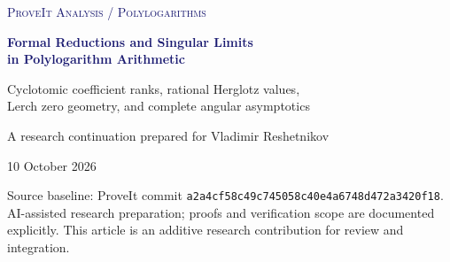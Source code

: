\documentclass[11pt,a4paper]{article}
\theoremstyle{definition}
\theoremstyle{remark}
\numberwithin{equation}{section}
\begin{document}
\hypersetup{pageanchor=false}
\begin{titlepage}
\thispagestyle{empty}
\setlength{\parindent}{0pt}
\vspace*{12mm}
{\small\scshape\textcolor{midnightblue}{ProveIt \quad Analysis / Polylogarithms}\par}
\vspace{9mm}
{\LARGE\bfseries\textcolor{midnightblue}{Formal Reductions and Singular Limits\\[3mm] in Polylogarithm Arithmetic}\par}
\vspace{8mm}
{\large Cyclotomic coefficient ranks, rational Herglotz values,\\[1mm]
Lerch zero geometry, and complete angular asymptotics\par}
\vspace{12mm}
{\normalsize A research continuation prepared for Vladimir Reshetnikov\par}
\vspace{2mm}
{\normalsize 10 October 2026\par}
\vspace{13mm}
\begin{abstract}
We continue the ProveIt polylogarithm manuscript at a fixed repository
snapshot, distinguishing newly proved results from recently completed
incoming research. We prove its odd-weight Gaussian coefficient-rank
conjecture, determine the even-weight ranks, and construct a canonical
same-point splitting at every cyclotomic level. For the companion
Herglotz integral $J(p/q)$, we give a complete rational-dilogarithm and
logarithmic classification in the manuscript's rationalized five-term
calculus, together with explicit positive-real evaluations. For
differentiated Lerch logarithmic sums, we classify every small-parameter
zero pattern, prove the optimal uniform threshold $K_2=1$, exhibit a
nonmonotone zero branch, and compute the first singular Abel coefficient
and the exact endpoint regularity of simple zero branches. Finally,
we construct the angular-zero expansion to every exponential order,
uniformly in the second index, and prove that its untruncated series
diverges at every fixed first index. Exact coefficient generators, rational sign certificates, independent numerical diagnostics, a narrow
editorial patch, and a proposed research program accompany the proofs.
Formal relation ranks and five-term obstructions are kept distinct from
unproved independence statements about numerical periods.
\end{abstract}
\vfill
{\small\textcolor{quietgray}{Source baseline: ProveIt commit
\texttt{a2a4cf58c49c745058c40e4a6748d472a3420f18}.\\[2mm]
AI-assisted research preparation; proofs and verification scope are
documented explicitly. This article is an additive research contribution
for review and integration.}\par}
\end{titlepage}
\hypersetup{pageanchor=true}
\tableofcontents
\clearpage
{}
\end{document}
